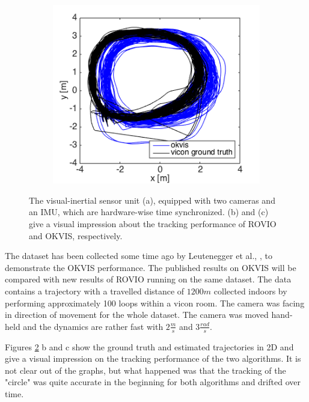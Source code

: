 \begin{figure}
  \hfill
  \begin{subfigure}[b]{0.3\textwidth}
    \includegraphics[width=\textwidth]{images/ijrr/2D_okvis.png}
    \caption{}
    \label{fig:2}
  \end{subfigure}
   \caption{The visual-inertial sensor unit (a), equipped with two cameras and an IMU, which are hardware-wise time synchronized. (b) and (c) give a visual impression about the tracking performance of ROVIO and OKVIS, respectively.}
   \label{pics:visensor}
\end{figure}

The dataset has been collected some time ago by Leutenegger et al., \cite{leutenegger2015keyframe}, to demonstrate the OKVIS performance. The published results on OKVIS will be compared with new results of ROVIO running on the same dataset. The data contains a trajectory with a travelled distance of $1200 m$ collected indoors by performing approximately 100 loops within a vicon room. The camera was facing in direction of movement for the whole dataset. The camera was moved hand-held and the dynamics are rather fast with $2 \frac{m}{s}$ and $3 \frac{rad}{s}$.

Figures \ref{pics:visensor} b and c show the ground truth and estimated trajectories in 2D and give a visual impression on the tracking performance of the two algorithms. It is not clear out of the graphs, but what happened was that the tracking of the "circle" was quite accurate in the beginning for both algorithms and drifted over time.

